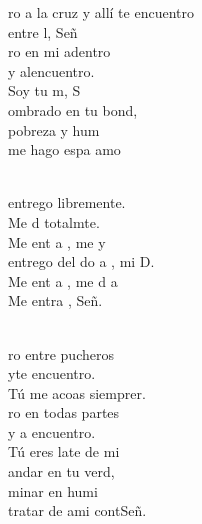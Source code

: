 \begin{cancion}%
	ro a la cruz y allí te encuentro  \\
	entre l, Señ\\
	ro en mi adentro  \\
	y alencuentro.  \\
	Soy tu m, S \\
	ombrado en tu bond,  \\
	 pobreza y hum \\
	me hago espa  amo  \\\jump\\
	\begin{chorus}%
	 entrego libremente.  \\
	Me d totalmte.  \\
	Me ent a , me y   \\
	 entrego del do a , mi D.  \\
	Me ent a , me d a \\
	Me entra , Señ. \\
	\end{chorus}%
	\jump\\
	ro entre pucheros \\
	yte encuentro.  \\
	Tú me acoas siemprer.  \\
	ro en todas partes  \\
	y a encuentro.  \\
	Tú eres late de mi \\
	andar en tu verd,  \\
	minar en humi\\
	tratar de ami contSeñ. \\\jump\\

\end{cancion}
